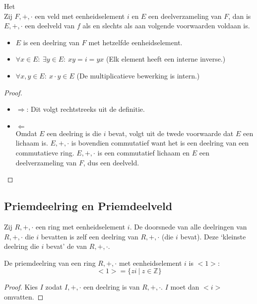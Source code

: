 \documentclass[main.tex]{subfiles}
\begin{document}
\begin{st}
  Het \\
  Zij $F,+,\cdot$ een veld met eenheidselement $i$ en $E$ een deelverzameling van $F$, dan is $E,+,\cdot$ een deelveld van $f$ als en slechts als aan volgende voorwaarden voldaan is.
  \begin{itemize}
  \item $E$ is een deelring van $F$ met hetzelfde eenheidselement.
  \item $\forall x\in E:\ \exists y\in E:\ xy =i = yx$ (Elk element heeft een interne inverse.)
  \item $\forall x,y\in E:\ x\cdot y \in E$ (De multiplicatieve bewerking is intern.)
  \end{itemize}

  \begin{proof}
    \begin{itemize}
    \item $\Rightarrow$: Dit volgt rechtstreeks uit de definitie.
    \item $\Leftarrow$\\
      Omdat $E$ een deelring is die $i$ bevat, volgt uit de twede voorwaarde dat $E$ een lichaam is.
      $E,+,\cdot$ is bovendien commutatief want het is een deelring van een commutatieve ring. \needed
      $E,+,\cdot$ is een commutatief lichaam en $E$ een deelverzameling van $F$, dus een deelveld.
    \end{itemize}
  \end{proof}
\end{st}

\subsection{Priemdeelring en Priemdeelveld}
\label{sec:priemd-en-priemd}

\begin{de}
  Zij $R,+,\cdot$ een ring met eenheidselement $i$.
  De doorsnede van alle deelringen van $R,+,\cdot$ die $i$ bevatten is zelf een deelring van $R,+,\cdot$ (die $i$ bevat).
  Deze `kleinste deelring die $i$ bevat' de  van $R,+,\cdot$.
\end{de}

\begin{ei}
  \label{ei:priemdeelring-voortgebracht-door-eenheidselement}
  De priemdeelring van een ring $R,+,\cdot$ met eenheidselement $i$ is $<1>$:
  \[ <1> = \{ zi \ |\ z \in \mathbb{Z} \} \]

  \begin{proof}
    Kies $I$ zodat $I,+,\cdot$ een deelring is van $R,+,\cdot$.
    $I$ moet dan $<i>$ omvatten.
  \end{proof}
\end{ei}
\end{document}
